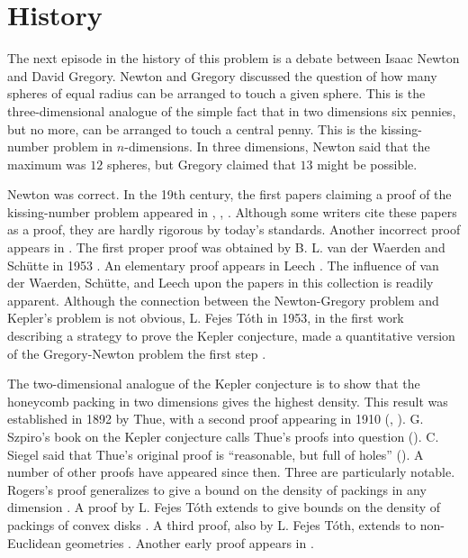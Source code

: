 \section{History}
\label{sec:history}

The next episode in the history of this problem is a debate
between Isaac Newton and David Gregory.  Newton and Gregory
discussed the question of how many spheres of equal radius can be
arranged to touch a given sphere.  This is the three-dimensional
analogue of the simple fact that in two dimensions six pennies,
but no more, can be arranged to touch a central penny.  This is
the kissing-number problem in $n$-dimensions. In three dimensions,
Newton said that the maximum was $12$ spheres, but Gregory claimed
that $13$ might be possible.

Newton was correct.
In the 19th century, the first papers claiming a proof of the
kissing-number problem appeared
in \cite{Ben74}, \cite{Gun75}, \cite{Hop74}.
Although some writers cite these papers
as a proof, they are hardly rigorous by today's standards.
Another incorrect
proof appears in \cite{Boe52}.
  The first proper proof was obtained
by B. L. van der Waerden and Sch\"utte in 1953 \cite{Sch53}.
An elementary proof appears in Leech \cite{Lee56}.
The influence of van der Waerden, Sch\"utte, and Leech upon the
papers in this collection is readily apparent.  Although the
connection between the Newton-Gregory problem and Kepler's problem
is not obvious, L. Fejes T\'oth in 1953, in the first
work describing a strategy to prove the Kepler conjecture, made
a quantitative version of the Gregory-Newton problem the first step
\cite{Fej53}.


The two-dimensional analogue of the Kepler conjecture is to show
that the honeycomb packing in two dimensions gives the highest
density.  This result was established in 1892 by Thue, with a second
proof appearing in 1910 (\cite{Thu92}, \cite{Thu10}). G. Szpiro's
book on the Kepler conjecture calls Thue's proofs into question
(\cite{Szp02}).  C. Siegel said that Thue's original proof is
``reasonable, but full of holes'' (\cite{Szp02}). A number of other
proofs have appeared since then. Three are particularly notable.
Rogers's proof generalizes to give a bound on the density of
packings in any dimension \cite{Rog58}. A proof by L. Fejes T\'oth
extends to give bounds on the density of packings of convex disks
\cite{Fej50}. A third proof, also by L. Fejes T\'oth, extends to
non-Euclidean geometries \cite{Fej53}. Another early proof appears
in \cite{SeM44}.

